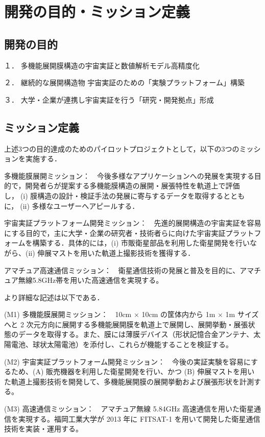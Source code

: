 \section{開発の目的・ミッション定義}

\subsection{開発の目的}

１． 多機能展開膜構造の宇宙実証と数値解析モデル高精度化

２． 継続的な展開構造物 宇宙実証のための「実験プラットフォーム」構築

３． 大学・企業が連携し宇宙実証を行う「研究・開発拠点」形成

\subsection{ミッション定義}

上述3つの目的達成のためのパイロットプロジェクトとして，以下の3つのミッションを実施する．

多機能膜展開ミッション：　今後多様なアプリケーションへの発展を実現する目的で，開発者らが提案する多機能膜構造の展開・展張特性を軌道上で評価し，(i) 膜構造の設計・検証手法の発展に寄与するデータを取得するとともに，(ii) 多様なユーザーへアピールする．

宇宙実証プラットフォーム開発ミッション：　先進的展開構造の宇宙実証を容易にする目的で，主に大学・企業の研究者・技術者らに向けた宇宙実証プラットフォームを構築する．具体的には，(i) 市販衛星部品を利用した衛星開発を行いながら、(ii) 伸展マストを用いた軌道上撮影技術を獲得する．

アマチュア高速通信ミッション：　衛星通信技術の発展と普及を目的に、アマチュア無線5.8GHz帯を用いた高速通信を実現する。

より詳細な記述は以下である．

(M1)	多機能膜展開ミッション：　10cm × 10cm の筐体内から 1m × 1m サイズへと 2 次元方向に展開する多機能展開膜を軌道上で展開し、展開挙動・展張状態のデータを取得する。また、膜には薄膜デバイス（形状記憶合金アンテナ、太陽電池、球状太陽電池）を添付し、これらが機能することを検証する。

(M2)	宇宙実証プラットフォーム開発ミッション：　今後の実証実験を容易にするため、(A) 販売機器を利用した衛星開発を行い、かつ (B) 伸展マストを用いた軌道上撮影技術を開発して、多機能展開膜の展開挙動および展張形状を計測する。

(M3)	高速通信ミッション：　アマチュア無線 5.84GHz 高速通信を用いた衛星通信を実現する。福岡工業大学が 2013 年に FITSAT-1 を用いて開発した衛星通信技術を実装・運用する。

